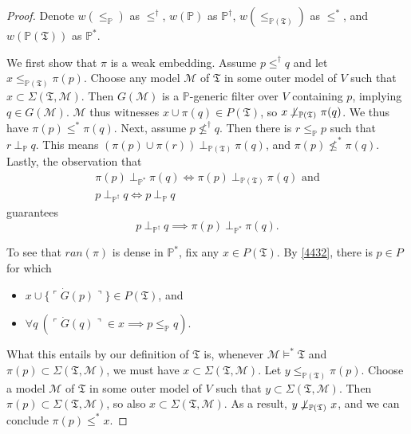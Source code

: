\documentclass[12pt]{article}
\numberwithin{equation}{section}
\begin{document}
\begin{proof}
Denote $w(\leq_{\mathbb{P}})$ as $\leq^{\dagger}$, $w(\mathbb{P})$ as $\mathbb{P}^{\dagger}$, $w(\leq_{\mathbb{P}(\mathfrak{T})})$ as $\leq^*$, and $w(\mathbb{P}(\mathfrak{T}))$ as $\mathbb{P}^*$. 

We first show that $\pi$ is a weak embedding. Assume $p \leq^{\dagger} q$ and let $x \leq_{\mathbb{P}(\mathfrak{T})} \pi(p)$. Choose any model $\mathcal{M}$ of $\mathfrak{T}$ in some outer model of $V$ such that $x \subset \Sigma(\mathfrak{T}, \mathcal{M})$. Then $G(\mathcal{M})$ is a $\mathbb{P}$-generic filter over $V$ containing $p$, implying $q \in G(\mathcal{M})$. $\mathcal{M}$ thus witnesses $x \cup \pi(q) \in P(\mathfrak{T})$, so $x \not \! \! \bot_{\mathbb{P}(\mathfrak{T})} \ \pi(q)$. We thus have $\pi(p) \leq^* \pi(q)$. Next, assume $p \not \leq^{\dagger} q$. Then there is $r \leq_{\mathbb{P}} p$ such that $r \ \bot_{\mathbb{P}} \ q$. This means $(\pi(p) \cup \pi(r)) \ \bot_{\mathbb{P}(\mathfrak{T})} \ \pi(q)$, and $\pi(p) \not \leq^* \pi(q)$. Lastly, the observation that
\begin{gather*}
    \pi(p) \ \bot_{\mathbb{P}^*} \ \pi(q) \iff \pi(p) \ \bot_{\mathbb{P}(\mathfrak{T})} \ \pi(q) \text{ and} \\
    p \ \bot_{\mathbb{P}^{\dagger}} \ q \iff p \ \bot_{\mathbb{P}} \ q
\end{gather*}
guarantees $$p \ \bot_{\mathbb{P}^{\dagger}} \ q \implies  \pi(p) \ \bot_{\mathbb{P}^*} \ \pi(q) \text{.}$$

To see that $ran(\pi)$ is dense in $\mathbb{P}^*$, fix any $x \in P(\mathfrak{T})$. By \ref{4432}, there is $p \in P$ for which
\begin{itemize}
    \item $x \cup \{\ulcorner \dot{G}(p) \urcorner\} \in P(\mathfrak{T})$, and
    \item $\forall q \ (\ulcorner \dot{G}(q) \urcorner \in x \implies p \leq_{\mathbb{P}} q)$.
\end{itemize}
What this entails by our definition of $\mathfrak{T}$ is, whenever $\mathcal{M} \models^* \mathfrak{T}$ and $\pi(p) \subset \Sigma(\mathfrak{T}, \mathcal{M})$, we must have $x \subset \Sigma(\mathfrak{T}, \mathcal{M})$. Let $y \leq_{\mathbb{P}(\mathfrak{T})} \pi(p)$. Choose a model $\mathcal{M}$ of $\mathfrak{T}$ in some outer model of $V$ such that $y \subset \Sigma(\mathfrak{T}, \mathcal{M})$. Then $\pi(p) \subset \Sigma(\mathfrak{T}, \mathcal{M})$, so also $x \subset \Sigma(\mathfrak{T}, \mathcal{M})$. As a result, $y \not \! \! \bot_{\mathbb{P}(\mathfrak{T})} \ x$, and we can conclude $\pi(p) \leq^* x$.
\end{proof}
\end{document}
